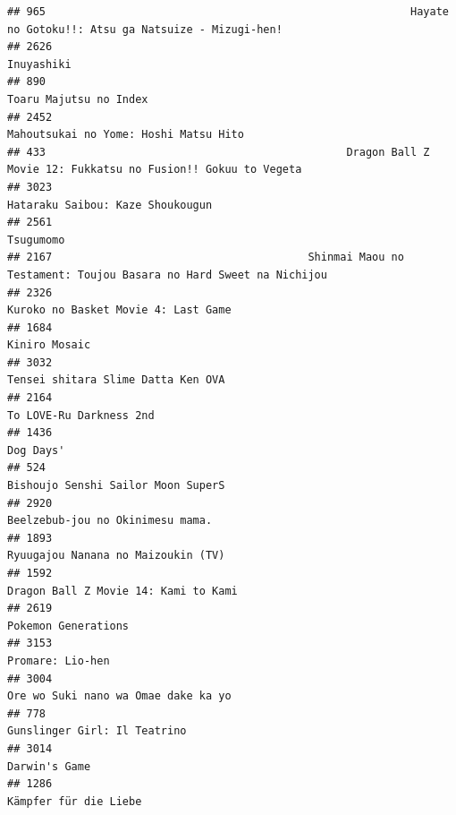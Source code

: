 \documentclass[
]{article}
\begin{document}
\begin{verbatim}
## 965                                                         Hayate no Gotoku!!: Atsu ga Natsuize - Mizugi-hen!
## 2626                                                                                                Inuyashiki
## 890                                                                                     Toaru Majutsu no Index
## 2452                                                                     Mahoutsukai no Yome: Hoshi Matsu Hito
## 433                                               Dragon Ball Z Movie 12: Fukkatsu no Fusion!! Gokuu to Vegeta
## 3023                                                                          Hataraku Saibou: Kaze Shoukougun
## 2561                                                                                                 Tsugumomo
## 2167                                        Shinmai Maou no Testament: Toujou Basara no Hard Sweet na Nichijou
## 2326                                                                       Kuroko no Basket Movie 4: Last Game
## 1684                                                                                             Kiniro Mosaic
## 3032                                                                        Tensei shitara Slime Datta Ken OVA
## 2164                                                                                   To LOVE-Ru Darkness 2nd
## 1436                                                                                                 Dog Days'
## 524                                                                         Bishoujo Senshi Sailor Moon SuperS
## 2920                                                                          Beelzebub-jou no Okinimesu mama.
## 1893                                                                        Ryuugajou Nanana no Maizoukin (TV)
## 1592                                                                      Dragon Ball Z Movie 14: Kami to Kami
## 2619                                                                                       Pokemon Generations
## 3153                                                                                          Promare: Lio-hen
## 3004                                                                       Ore wo Suki nano wa Omae dake ka yo
## 778                                                                               Gunslinger Girl: Il Teatrino
## 3014                                                                                             Darwin's Game
## 1286                                                                                     Kämpfer für die Liebe

\end{verbatim}
\end{document}
